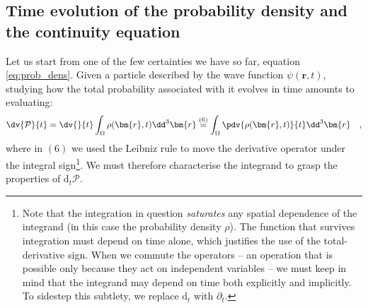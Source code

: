 \subsection{Time evolution of the probability density and the continuity equation}
Let us start from one of the few certainties we have so far, equation \eqref{eq:prob_dens}. Given a particle described by the wave function $\psi(\bm{r},t)$, studying how the total probability associated with it evolves in time amounts to evaluating:
\begin{equation}
    \dv{\mathcal{P}}{t} = \dv{}{t} \int_\Omega \rho(\bm{r}, t) \dd^3{\bm{r}} \overset{(6)}{=} \int_\Omega \pdv{\rho(\bm{r}, t)}{t} \dd^3{\bm{r}} \quad,
    \label{eq:studio_dens_prob}
\end{equation}
where in $(6)$ we used the Leibniz rule to move the derivative operator under the integral sign\footnote{Note that the integration in question \emph{saturates} any spatial dependence of the integrand (in this case the probability density $\rho$). The function that survives integration must depend on time alone, which justifies the use of the total-derivative sign. When we commute the operators -- an operation that is possible only because they act on independent variables -- we must keep in mind that the integrand may depend on time both explicitly and implicitly. To sidestep this subtlety, we replace $\text{d}_t$ with $\partial_t$.}. We must therefore characterise the integrand to grasp the properties of $\text{d}_t \mathcal{P}$.

